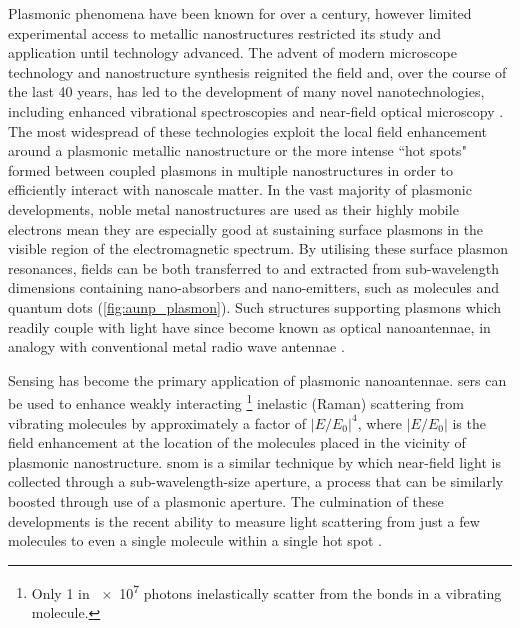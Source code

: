 \documentclass[12pt, a4paper, twoside]{book}
\begin{document}
Plasmonic phenomena have been known for over a century, however limited experimental access to metallic nanostructures restricted its study and application until technology advanced. The advent of modern microscope technology and nanostructure synthesis reignited the field and, over the course of the last 40 years, has led to the development of many novel nanotechnologies, including enhanced vibrational spectroscopies \cite{fleischmann1974, jeanmaire1977} and near-field optical microscopy \cite{ash1972super, pohl1984optical, lewis1984development, pohl1986optical, harootunian1986super, betzig1988near}. The most widespread of these technologies exploit the local field enhancement around a plasmonic metallic nanostructure or the more intense ``hot spots" formed between coupled plasmons in multiple nanostructures in order to efficiently interact with nanoscale matter. In the vast majority of plasmonic developments, noble metal nanostructures are used as their highly mobile electrons mean they are especially good at sustaining surface plasmons in the visible region of the electromagnetic spectrum. By utilising these surface plasmon resonances, fields can be both transferred to and extracted from sub-wavelength dimensions containing nano-absorbers and nano-emitters, such as molecules and quantum dots (\autoref{fig:aunp_plasmon}). Such structures supporting plasmons which readily couple with light have since become known as optical nanoantennae, in analogy with conventional metal radio wave antennae \cite{novotny2011}.

Sensing has become the primary application of plasmonic nanoantennae. \Gls{sers} can be used to enhance weakly interacting%
\footnote{Only 1 in \num{e7} photons inelastically scatter from the bonds in a vibrating molecule.}
inelastic (Raman) scattering from vibrating molecules \cite{raman1928} by approximately a factor of $|E/E_0|^4$, where $|E/E_0|$ is the field enhancement at the location of the molecules placed in the vicinity of plasmonic nanostructure. \Gls{snom} is a similar technique by which near-field light is collected through a sub-wavelength-size aperture, a process that can be similarly boosted through use of a plasmonic aperture. The culmination of these developments is the recent ability to measure light scattering from just a few molecules to even a single molecule within a single hot spot \cite{zhang2013}.
\end{document}
